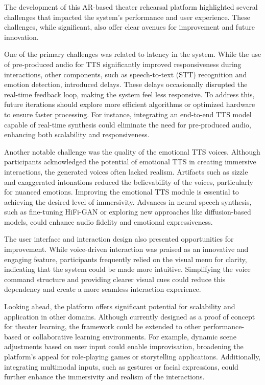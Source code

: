 The development of this AR-based theater rehearsal platform highlighted several challenges that impacted the system’s performance and user experience. These challenges, while significant, also offer clear avenues for improvement and future innovation.

One of the primary challenges was related to latency in the system. While the use of pre-produced audio for TTS significantly improved responsiveness during interactions, other components, such as speech-to-text (STT) recognition and emotion detection, introduced delays. These delays occasionally disrupted the real-time feedback loop, making the system feel less responsive. To address this, future iterations should explore more efficient algorithms or optimized hardware to ensure faster processing. For instance, integrating an end-to-end TTS model capable of real-time synthesis could eliminate the need for pre-produced audio, enhancing both scalability and responsiveness.

Another notable challenge was the quality of the emotional TTS voices. Although participants acknowledged the potential of emotional TTS in creating immersive interactions, the generated voices often lacked realism. Artifacts such as sizzle and exaggerated intonations reduced the believability of the voices, particularly for nuanced emotions. Improving the emotional TTS module is essential to achieving the desired level of immersivity. Advances in neural speech synthesis, such as fine-tuning HiFi-GAN or exploring new approaches like diffusion-based models, could enhance audio fidelity and emotional expressiveness.

The user interface and interaction design also presented opportunities for improvement. While voice-driven interaction was praised as an innovative and engaging feature, participants frequently relied on the visual menu for clarity, indicating that the system could be made more intuitive. Simplifying the voice command structure and providing clearer visual cues could reduce this dependency and create a more seamless interaction experience.

Looking ahead, the platform offers significant potential for scalability and application in other domains. Although currently designed as a proof of concept for theater learning, the framework could be extended to other performance-based or collaborative learning environments. For example, dynamic scene adjustments based on user input could enable improvisation, broadening the platform’s appeal for role-playing games or storytelling applications. Additionally, integrating multimodal inputs, such as gestures or facial expressions, could further enhance the immersivity and realism of the interactions.

